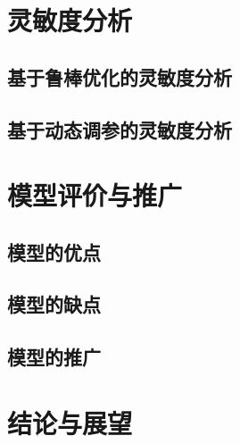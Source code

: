 \documentclass[withoutpreface]{cumcmthesis}
\begin{document}
\section{灵敏度分析}
\subsection{基于鲁棒优化的灵敏度分析}
\subsection{基于动态调参的灵敏度分析}

\section{模型评价与推广}
\subsection{模型的优点}
\subsection{模型的缺点}
\subsection{模型的推广}

\section{结论与展望}



\end{document}
